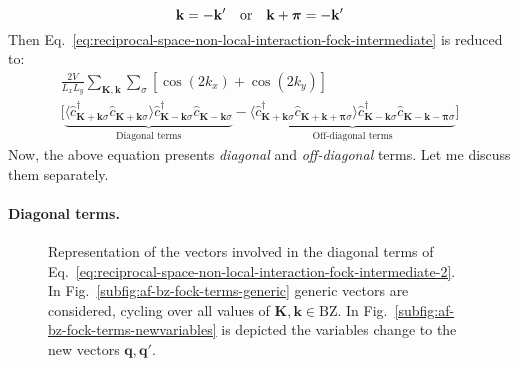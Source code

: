 \[
	\mathbf{k} = -\mathbf{k}'
	\qq{or}
	\mathbf{k}+\bm{\pi} = -\mathbf{k}'
\]
Then Eq.~\eqref{eq:reciprocal-space-non-local-interaction-fock-intermediate} is reduced to:
\begin{multline}
	\frac{2V}{L_x L_y} \sum_{\mathbf{K}, \mathbf{k}} \sum_\sigma \left[
		\cos \left(
			2k_x
		\right)	+ \cos \left(
			2k_y
		\right)	
	\right]	\\
	\Big[
		\underbrace{
			\langle
				\hat c_{\mathbf{K}+\mathbf{k} \sigma}^\dagger 
				\hat 	c_{\mathbf{K}+\mathbf{k} \sigma}
			\rangle
			\hat c_{\mathbf{K}-\mathbf{k} \sigma}^\dagger  \hat c_{\mathbf{K}-\mathbf{k}\sigma}
		}_\text{Diagonal terms}
		-
		\underbrace{
			\langle
				\hat c_{\mathbf{K}+\mathbf{k} \sigma}^\dagger 
				\hat 	c_{\mathbf{K}+\mathbf{k}+\bm{\pi} \sigma}
			\rangle
			\hat c_{\mathbf{K}-\mathbf{k} \sigma}^\dagger  \hat c_{\mathbf{K}-\mathbf{k}-\bm{\pi}\sigma}
		}_\text{Off-diagonal terms}
	\Big] \label{eq:reciprocal-space-non-local-interaction-fock-intermediate-2}
\end{multline}
Now, the above equation presents \textit{diagonal} and \textit{off-diagonal} terms. Let me discuss them separately.

\paragraph{Diagonal terms.}

\begin{figure}
	\def\Kx{0.5}
	\def\Ky{0.2}
	\def\kx{0.1}
	\def\ky{0.7}
	\centering
	\caption{Representation of the vectors involved in the diagonal terms of Eq.~\eqref{eq:reciprocal-space-non-local-interaction-fock-intermediate-2}. In Fig.~\ref{subfig:af-bz-fock-terms-generic} generic vectors are considered, cycling over all values of $\mathbf{K},\mathbf{k}\in\mathrm{BZ}$. In Fig.~\ref{subfig:af-bz-fock-terms-newvariables} is depicted the variables change to the new vectors $\mathbf{q},\mathbf{q}'$.}
	\label{fig:af-bz-fock-terms}
\end{figure}

